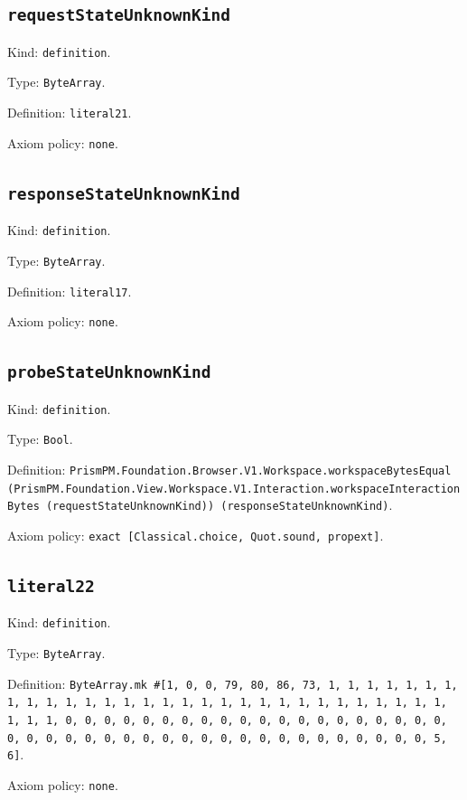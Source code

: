 \documentclass[11pt]{article}
\begin{document}
\subsection*{\texttt{requestStateUnknownKind}}
\noindent Kind: \texttt{definition}.\par
\noindent Type: \texttt{ByteArray}.\par
\noindent Definition: \texttt{literal21}.\par
\noindent Axiom policy: \texttt{none}.\par
\subsection*{\texttt{responseStateUnknownKind}}
\noindent Kind: \texttt{definition}.\par
\noindent Type: \texttt{ByteArray}.\par
\noindent Definition: \texttt{literal17}.\par
\noindent Axiom policy: \texttt{none}.\par
\subsection*{\texttt{probeStateUnknownKind}}
\noindent Kind: \texttt{definition}.\par
\noindent Type: \texttt{Bool}.\par
\noindent Definition: \texttt{PrismPM.Foundation.Browser.V1.Workspace.workspaceBytesEqual (PrismPM.Foundation.View.Workspace.V1.Interaction.workspaceInteractionBytes (requestStateUnknownKind)) (responseStateUnknownKind)}.\par
\noindent Axiom policy: \texttt{exact [Classical.choice, Quot.sound, propext]}.\par
\subsection*{\texttt{literal22}}
\noindent Kind: \texttt{definition}.\par
\noindent Type: \texttt{ByteArray}.\par
\noindent Definition: \texttt{ByteArray.mk \#[1, 0, 0, 79, 80, 86, 73, 1, 1, 1, 1, 1, 1, 1, 1, 1, 1, 1, 1, 1, 1, 1, 1, 1, 1, 1, 1, 1, 1, 1, 1, 1, 1, 1, 1, 1, 1, 1, 1, 1, 0, 0, 0, 0, 0, 0, 0, 0, 0, 0, 0, 0, 0, 0, 0, 0, 0, 0, 0, 0, 0, 0, 0, 0, 0, 0, 0, 0, 0, 0, 0, 0, 0, 0, 0, 0, 0, 0, 0, 0, 0, 0, 5, 6]}.\par
\noindent Axiom policy: \texttt{none}.\par
\end{document}
